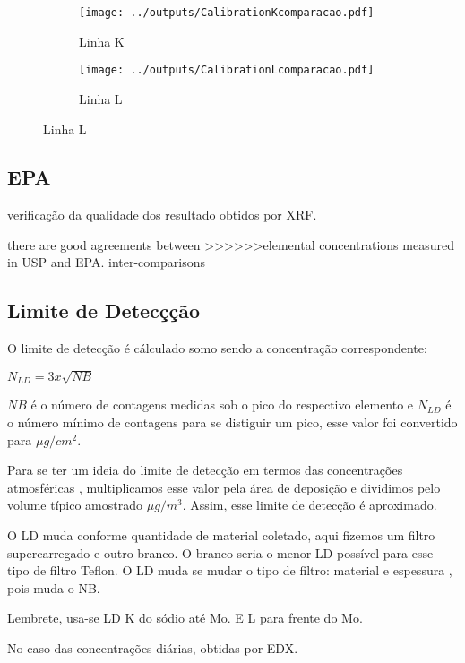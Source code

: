 \begin{figure}[H]
  \caption{Calibrações de Fluorescência de Raiox X em 3 períodos \label{fig:compara_calibracao}}
  \begin{subfigure}[b]{0.5\textwidth}
    \texttt{[image: ../outputs/CalibrationKcomparacao.pdf]}
    \caption{Linha K}
  \end{subfigure}%
  \begin{subfigure}[b]{0.5\textwidth}
    \texttt{[image: ../outputs/CalibrationLcomparacao.pdf]}
    \caption{Linha L}
  \end{subfigure}
\end{figure}

\subsection{EPA}

verificação da qualidade dos resultado obtidos por XRF.

there are good agreements between
>>>>>>elemental concentrations measured in USP and EPA. 
inter-comparisons

\subsection{Limite de Detecçção}

O limite de detecção é cálculado somo sendo a concentração correspondente: 

$N_{LD} = 3 x \sqrt{NB}$

$NB$ é o número de contagens medidas sob o pico do respectivo elemento e $N_{LD}$ 
é o número mínimo de contagens para se distiguir um pico, esse valor foi convertido para
$\mu g/cm^2$. 

Para se ter um ideia do limite de detecção em termos das concentrações atmosféricas 
, multiplicamos esse valor pela área de deposição e 
dividimos pelo volume típico amostrado $\mu g/m^3$. Assim, esse limite de detecção 
é aproximado. 

O LD muda conforme quantidade de material coletado, aqui fizemos um filtro supercarregado
e outro branco. O branco seria o menor LD possível para esse tipo de filtro Teflon. 
O LD muda se mudar o tipo de filtro: material e espessura , pois muda o NB. 

Lembrete, usa-se LD K do sódio até Mo. E L para frente do Mo.  
  

No caso das concentrações diárias, obtidas por EDX.  

